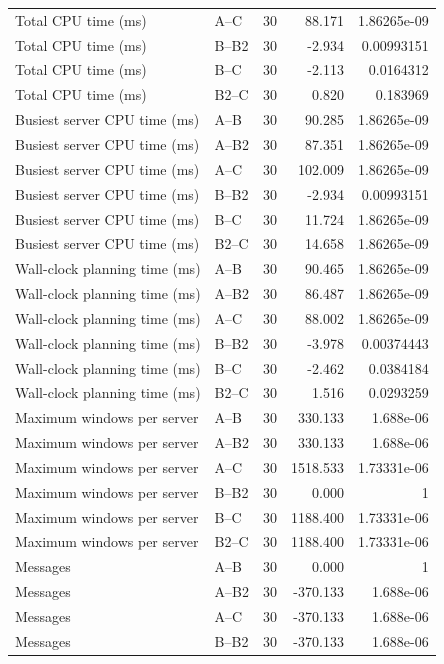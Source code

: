 \begin{table}[t]
\begin{tabular}{llrrr}
Total CPU time (ms) & A--C & 30 & 88.171 & 1.86265e-09 \\
Total CPU time (ms) & B--B2 & 30 & -2.934 & 0.00993151 \\
Total CPU time (ms) & B--C & 30 & -2.113 & 0.0164312 \\
Total CPU time (ms) & B2--C & 30 & 0.820 & 0.183969 \\
Busiest server CPU time (ms) & A--B & 30 & 90.285 & 1.86265e-09 \\
Busiest server CPU time (ms) & A--B2 & 30 & 87.351 & 1.86265e-09 \\
Busiest server CPU time (ms) & A--C & 30 & 102.009 & 1.86265e-09 \\
Busiest server CPU time (ms) & B--B2 & 30 & -2.934 & 0.00993151 \\
Busiest server CPU time (ms) & B--C & 30 & 11.724 & 1.86265e-09 \\
Busiest server CPU time (ms) & B2--C & 30 & 14.658 & 1.86265e-09 \\
Wall-clock planning time (ms) & A--B & 30 & 90.465 & 1.86265e-09 \\
Wall-clock planning time (ms) & A--B2 & 30 & 86.487 & 1.86265e-09 \\
Wall-clock planning time (ms) & A--C & 30 & 88.002 & 1.86265e-09 \\
Wall-clock planning time (ms) & B--B2 & 30 & -3.978 & 0.00374443 \\
Wall-clock planning time (ms) & B--C & 30 & -2.462 & 0.0384184 \\
Wall-clock planning time (ms) & B2--C & 30 & 1.516 & 0.0293259 \\
Maximum windows per server & A--B & 30 & 330.133 & 1.688e-06 \\
Maximum windows per server & A--B2 & 30 & 330.133 & 1.688e-06 \\
Maximum windows per server & A--C & 30 & 1518.533 & 1.73331e-06 \\
Maximum windows per server & B--B2 & 30 & 0.000 & 1 \\
Maximum windows per server & B--C & 30 & 1188.400 & 1.73331e-06 \\
Maximum windows per server & B2--C & 30 & 1188.400 & 1.73331e-06 \\
Messages & A--B & 30 & 0.000 & 1 \\
Messages & A--B2 & 30 & -370.133 & 1.688e-06 \\
Messages & A--C & 30 & -370.133 & 1.688e-06 \\
Messages & B--B2 & 30 & -370.133 & 1.688e-06 \\

\end{tabular}
\end{table}
